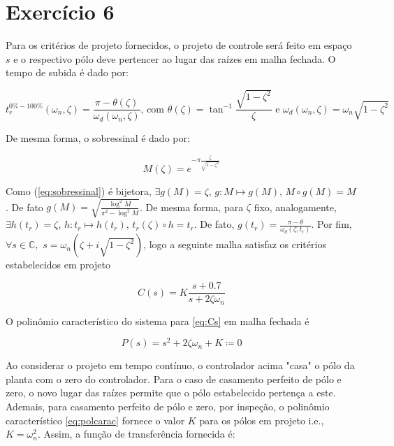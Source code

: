 \section*{Exercício 6}

    Para os critérios de projeto fornecidos, o projeto de controle será feito em espaço $s$ e o respectivo pólo deve pertencer ao lugar das raízes em malha fechada. O tempo de subida é dado por:
    
        \begin{equation}
            t^{0\% - 100\%}_{r}(\omega_n, \zeta) = \frac{\pi - \theta(\zeta)}{\omega_d(\omega_n, \zeta)} \mbox{, com } \theta(\zeta) = \tan^{-1}\frac{\sqrt{1 - \zeta^2}}{\zeta} \mbox{ e } \omega_d(\omega_n, \zeta) = \omega_n \sqrt{1-\zeta^2}
            \label{eq:tempo_de_subida}
        \end{equation}
    
    De mesma forma, o sobressinal é dado por:
    
        \begin{equation}
            M(\zeta) = e^{-\pi \frac{\zeta}{\sqrt{1-\zeta^2}}}
            \label{eq:sobressinal}
        \end{equation}
    
    Como (\ref{eq:sobressinal}) é bijetora, $\exists g(M) = \zeta \mbox{, } g: M \longmapsto g(M) \mbox{, } M \circ g (M) = M$. De fato $g(M) = \sqrt{\frac{\log^2{M}}{\pi^2 - \log^2{M}}}$. De mesma forma, para $\zeta$ fixo, analogamente, $\exists h(t_r) = \zeta\mbox{, }h: t_r \longmapsto h(t_r)\mbox{, } t_r(\zeta) \circ h = t_r$. De fato, $g(t_r) = \frac{\pi - \theta}{\omega_d(\zeta, t_r)}$. Por fim, $\forall s \in \mathbb{C}, \,\, s = \omega_n (\zeta + i \sqrt{1 - \zeta^2})$, logo a seguinte malha satisfaz os critérios estabelecidos em projeto
    
        \begin{equation}
        C(s) = K \frac{s + 0.7}{s + 2 \zeta \omega_n}
        \label{eq:Cs}
        \end{equation}
    
    O polinômio característico do sistema para \eqref{eq:Cs} em malha fechada é 
    
        \begin{equation}
        P(s) = s^2 + 2\zeta \omega_n + K \coloneqq 0
        \label{eq:polcarac}
        \end{equation}
    
    Ao considerar o projeto em tempo contínuo, o controlador acima "casa" o pólo da planta com o zero do controlador. Para o caso de casamento perfeito de pólo e zero, o novo lugar das raízes permite que o pólo estabelecido pertença a este. Ademais, para casamento perfeito de pólo e zero, por inspeção, o polinômio característico \eqref{eq:polcarac} fornece o valor $K$ para os pólos em projeto i.e., $K = \omega_n^2$. Assim, a função de transferência fornecida é:
    
